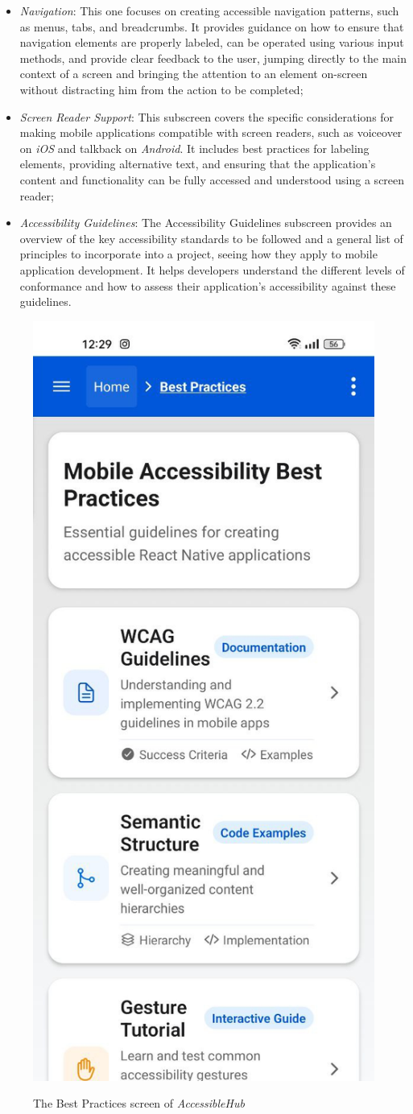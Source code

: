 \begin{enumerate}
\begin{itemize}
        \item \textit{Navigation}: This one focuses on creating accessible navigation patterns, such as menus, tabs, and breadcrumbs. It provides guidance on how to ensure that navigation elements are properly labeled, can be operated using various input methods, and provide clear feedback to the user, jumping directly to the main context of a screen and bringing the attention to an element on-screen without distracting him from the action to be completed;

        \item \textit{Screen Reader Support}: This subscreen covers the specific considerations for making mobile applications compatible with screen readers, such as \gls{voiceover} on \textit{iOS} and \gls{talkback} on \textit{Android}. It includes best practices for labeling elements, providing alternative text, and ensuring that the application's content and functionality can be fully accessed and understood using a screen reader;

        \item \textit{Accessibility Guidelines}: The Accessibility Guidelines subscreen provides an overview of the key accessibility standards to be followed and a general list of principles to incorporate into a project, seeing how they apply to mobile application development. It helps developers understand the different levels of conformance and how to assess their application's accessibility against these guidelines.
    \end{itemize}

\begin{figure}[ht]
\centering
\includegraphics[width=0.4\linewidth, alt={Screenshot of the Best Practices screen of AccessibleHub}]{img/best-practices.jpg}
\caption{The Best Practices screen of \textit{AccessibleHub}}\label{fig:best-practices}
\end{figure}


\end{enumerate}

